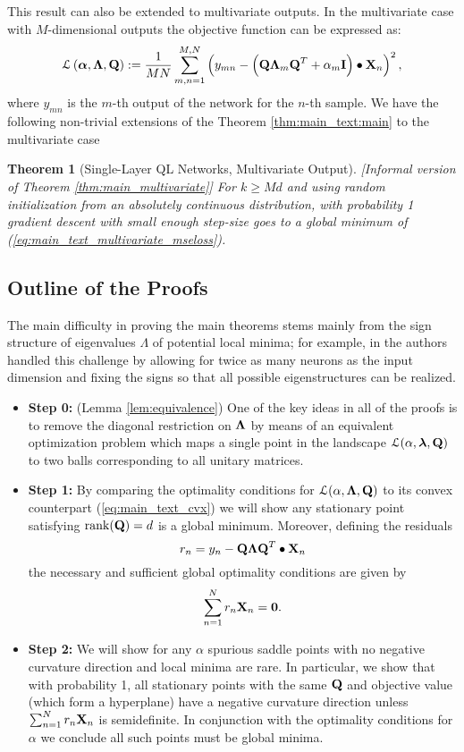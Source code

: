 \documentclass[11pt]{article}
\theoremstyle{plain}
\newtheorem{theorem}{Theorem}
\DeclareMathOperator*{\rank}{rank}
\theoremstyle{plain}
\numberwithin{equation}{section}
\numberwithin{lemma}{section}
\numberwithin{theorem}{section}
\numberwithin{corollary}{section}
\numberwithin{observation}{section}
\numberwithin{definition}{section}
\numberwithin{example}{section}
\begin{document}
This result can also be extended to multivariate outputs. In the multivariate case with $M$-dimensional outputs the objective function can be expressed as:
\begin{align} \label{eq:main_text_multivariate_mseloss}
\mathcal{L} \left(\V{\alpha}, {\Mx{\Lambda},\Mx{Q}} \right) := \frac{1}{MN}\sum_{m, n = 1}^{M,N} \left(y_{mn}-\left(\Mx{Q}\Mx{\Lambda}_m \Mx{Q}^T+\alpha_m \Mx{I} \right) \bullet \Mx{X}_n \right)^2, 
\end{align}
where $y_{mn}$ is the $m$-th output of the network for the $n$-th sample. We have the following non-trivial extensions of the Theorem \ref{thm:main_text:main} to the multivariate case
\begin{theorem}  [Single-Layer QL Networks, Multivariate Output] \label{thm:main_text:main_multivariate} [Informal version of Theorem \ref{thm:main_multivariate}] For $k \geq Md$ and using random initialization from an absolutely continuous distribution, with probability 1 gradient descent with small enough step-size goes to a global  minimum of (\ref{eq:main_text_multivariate_mseloss}).
\end{theorem}


\subsection{Outline of the Proofs}
The main difficulty in proving the main theorems stems mainly from the sign structure of eigenvalues $\Lambda$ of potential local minima; for example, in \cite{JS19} the authors handled this challenge by allowing for twice as many neurons as the input dimension and fixing the signs so that all possible eigenstructures can be realized.

\begin{itemize}
\item \textbf{Step 0:} (Lemma \ref{lem:equivalence}) One of the key ideas in all of the proofs is to remove the diagonal restriction on $\Mx{\Lambda}$ by means of an equivalent optimization problem which maps a single point in the landscape $\mathcal{L}(\alpha,\V{\lambda},\Mx{Q})$ to two balls corresponding to all unitary matrices.

\item \textbf{Step 1:} By comparing the optimality conditions for $\mathcal{L}(\alpha,\Mx{\Lambda},\Mx{Q})$ to its convex counterpart (\ref{eq:main_text_cvx}) we will show any stationary point satisfying $\rank(\Mx{Q}) = d$ is a global minimum. Moreover, defining the residuals 
\[
r_n = y_n - \Mx{Q\Lambda Q}^T \bullet \Mx{X}_n
\]
the necessary and sufficient global optimality conditions are given by
\[
\sum_{n=1}^N r_n \Mx{X}_n = \Mx{0}.
\]

\item \textbf{Step 2:} We will show for any $\alpha$ spurious saddle points with no negative curvature direction and local minima are rare. In particular, we show that with probability 1, all stationary points with the same $\Mx{Q}$ and objective value (which form a hyperplane) have a negative curvature direction unless $\sum_{n=1}^N r_n \Mx{X}_n$ is semidefinite. In conjunction with the optimality conditions for $\alpha$ we conclude all such points must be global minima.
\end{itemize}
\end{document}
